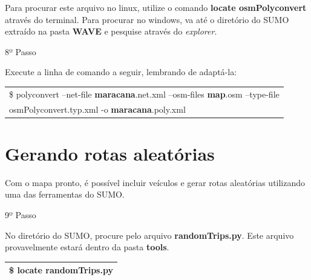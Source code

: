 \documentclass[
12pt,				%
openright,			%
oneside,			%
a4paper,			%
brazil,				%
]{abntex2}
\begin{document}
{\begin{anexosenv}
                \par Para procurar este arquivo no linux, utilize o comando \textbf{locate osmPolyconvert} através do terminal. Para procurar no windows, va até o diretório do SUMO extraído na pasta \textbf{WAVE} e pesquise através do \textit{explorer}.
                    

            	\begin{description}
                    \item[8º Passo]
                \end{description}
                \par Execute a linha de comando a seguir, lembrando de adaptá-la:
		
	            \begin{table}[H]
		            \renewcommand{\arraystretch}{1.5}
	                \begin{tabular}{|p{15.5cm}|}
		                \hline
                        \$ polyconvert --net-file \textbf{maracana}.net.xml --osm-files \textbf{map}.osm --type-file\\osmPolyconvert.typ.xml -o \textbf{maracana}.poly.xml \\
		                \hline
		            \end{tabular}
	            \end{table}
            
        	\section{Gerando rotas aleatórias}
        	
            	\par Com o mapa pronto, é possível incluir veículos e gerar rotas aleatórias utilizando uma das ferramentas do SUMO.
                    

            	\begin{description}
                    \item[9º Passo]
                \end{description}
                \par No diretório do SUMO, procure pelo arquivo \textbf{randomTrips.py}. Este arquivo provavelmente estará dentro da pasta \textbf{tools}.
		
	            \begin{table}[H]
		            \renewcommand{\arraystretch}{1.5}
	                \begin{tabular}{|p{15.5cm}|}
		                \hline
                        \$ locate \textbf{randomTrips.py} \\
		                \hline
		            \end{tabular}
	            \end{table}
                

\end{anexosenv}}
\end{document}
